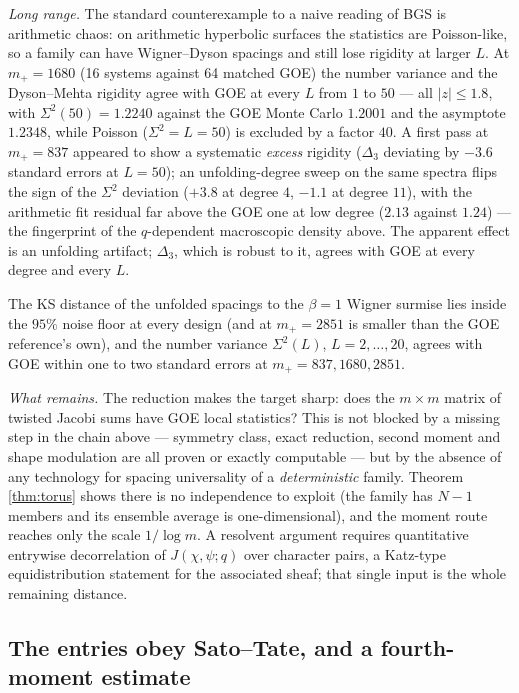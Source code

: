 \documentclass[11pt,reqno]{amsart}
\theoremstyle{definition}
\begin{document}
\emph{Long range.}  The standard counterexample to a naive reading of BGS is
arithmetic chaos: on arithmetic hyperbolic surfaces the statistics are
Poisson-like, so a family can have Wigner--Dyson spacings and still lose
rigidity at larger $L$.  At $m_+=1680$ (16 systems against 64 matched GOE) the
number variance and the Dyson--Mehta rigidity agree with GOE at every $L$ from
$1$ to $50$ --- all $|z|\le1.8$, with $\Sigma^2(50)=1.2240$ against the GOE
Monte Carlo $1.2001$ and the asymptote $1.2348$, while Poisson
($\Sigma^2=L=50$) is excluded by a factor $40$.  A first pass at $m_+=837$
appeared to show a systematic \emph{excess} rigidity ($\Delta_3$ deviating by
$-3.6$ standard errors at $L=50$); an unfolding-degree sweep on the same
spectra flips the sign of the $\Sigma^2$ deviation ($+3.8$ at degree $4$,
$-1.1$ at degree $11$), with the arithmetic fit residual far above the GOE one
at low degree ($2.13$ against $1.24$) --- the fingerprint of the
$q$-dependent macroscopic density above.  The apparent effect is an unfolding
artifact; $\Delta_3$, which is robust to it, agrees with GOE at every degree and
every $L$.

The KS distance of the unfolded spacings to the $\beta=1$ Wigner surmise lies
inside the $95\%$ noise floor at every design (and at $m_+=2851$ is smaller than
the GOE reference's own), and the number variance $\Sigma^2(L)$, $L=2,\dots,20$,
agrees with GOE within one to two standard errors at $m_+=837,1680,2851$.

\emph{What remains.}  The reduction makes the target sharp: does the $m\times m$
matrix of twisted Jacobi sums have GOE local statistics?  This is not blocked by
a missing step in the chain above --- symmetry class, exact reduction, second
moment and shape modulation are all proven or exactly computable --- but by the
absence of any technology for spacing universality of a \emph{deterministic}
family.  Theorem \ref{thm:torus} shows there is no independence to exploit (the
family has $N-1$ members and its ensemble average is one-dimensional), and the
moment route reaches only the scale $1/\log m$.  A resolvent argument requires
quantitative entrywise decorrelation of $J(\chi,\psi;q)$ over character pairs, a
Katz-type equidistribution statement for the associated sheaf; that single input
is the whole remaining distance.


\subsection{The entries obey Sato--Tate, and a fourth-moment
estimate}\label{sub:r82c}
\end{document}
